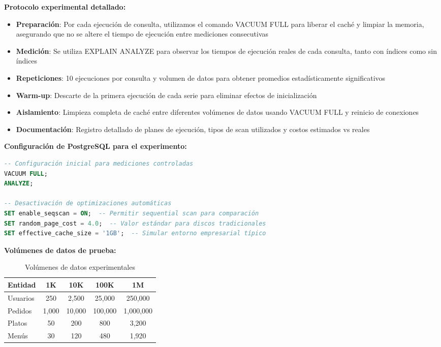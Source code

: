 \documentclass[12pt,a4paper]{article}
\begin{document}
\textbf{Protocolo experimental detallado:}
\begin{itemize}
    \item \textbf{Preparación}: Por cada ejecución de consulta, utilizamos el comando VACUUM FULL para liberar el caché y limpiar la memoria, asegurando que no se altere el tiempo de ejecución entre mediciones consecutivas
    \item \textbf{Medición}: Se utiliza EXPLAIN ANALYZE para observar los tiempos de ejecución reales de cada consulta, tanto con índices como sin índices
    \item \textbf{Repeticiones}: 10 ejecuciones por consulta y volumen de datos para obtener promedios estadísticamente significativos
    \item \textbf{Warm-up}: Descarte de la primera ejecución de cada serie para eliminar efectos de inicialización
    \item \textbf{Aislamiento}: Limpieza completa de caché entre diferentes volúmenes de datos usando VACUUM FULL y reinicio de conexiones
    \item \textbf{Documentación}: Registro detallado de planes de ejecución, tipos de scan utilizados y costos estimados vs reales
\end{itemize}

\textbf{Configuración de PostgreSQL para el experimento:}
\begin{lstlisting}[language=SQL]
-- Configuración inicial para mediciones controladas
VACUUM FULL;
ANALYZE;

-- Desactivación de optimizaciones automáticas
SET enable_seqscan = ON;  -- Permitir sequential scan para comparación
SET random_page_cost = 4.0;  -- Valor estándar para discos tradicionales
SET effective_cache_size = '1GB';  -- Simular entorno empresarial típico
\end{lstlisting}

\textbf{Volúmenes de datos de prueba:}
\begin{table}[h!]
\centering
\begin{tabular}{|l|c|c|c|c|}
\hline
\textbf{Entidad} & \textbf{1K} & \textbf{10K} & \textbf{100K} & \textbf{1M} \\
\hline
Usuarios & 250 & 2,500 & 25,000 & 250,000 \\
Pedidos & 1,000 & 10,000 & 100,000 & 1,000,000 \\
Platos & 50 & 200 & 800 & 3,200 \\
Menús & 30 & 120 & 480 & 1,920 \\
\hline
\end{tabular}
\caption{Volúmenes de datos experimentales}
\label{table:volumenes}
\end{table}
\end{document}
